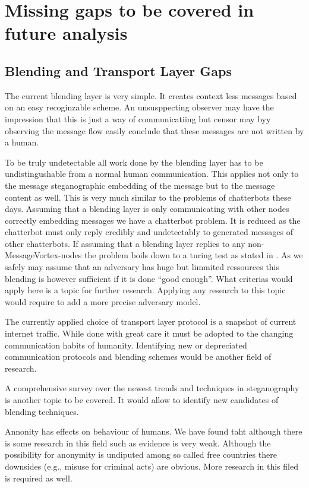 \chapter{Missing gaps to be covered in future analysis}
\section{Blending and Transport Layer Gaps}
The current blending layer is very simple. It creates context less messages based on an easy recoginzable scheme. An unsusppecting observer may have the impression that this is just a way of communicatiing but censor may byy observing the message flow easily conclude that these messages are not written by a human.

To be truly undetectable all work done by the blending layer has to be undistingushable from a normal human communication. This applies not only to the message steganographic embedding of the message but to the message content as well. This is very much similar to the problems of chatterbots these days. Assuming that a blending layer is only communicating with other nodes correctly embedding messages we have a chatterbot problem. It is reduced as the chatterbot must only reply credibly and undetectably to generated messages of other chatterbots. If assuming that a blending layer replies to any non-MessageVortex-nodes the problem boils down to a turing test as stated in \cite{turing1950computing}. As we safely may assume that an adversary has huge but limmited ressources this blending is however sufficient if it is done ``good enough''. What criterias would apply here is a topic for further research. Applying any research to this topic would require to add a more precise adversary model.

The currently applied choice of transport layer protocol is a snapshot of current internet traffic. While done with great care it must be adopted to the changing communication habits of humanity. Identifying new or depreciated communication protocols and blending schemes would be another field of research.

A comprehensive survey over the newest trends and techniques in steganography is another topic to be covered. It would allow to identify new candidates of blending techniques.

Annonity has effects on behaviour of humans. We have found taht although there is some research in this field such as \cite{postmes2001social} evidence is very weak. Although the possibility for anonymity is undiputed among so called free countries there downsides (e.g., misuse for criminal acts) are obvious. More research in this filed is required as well.


